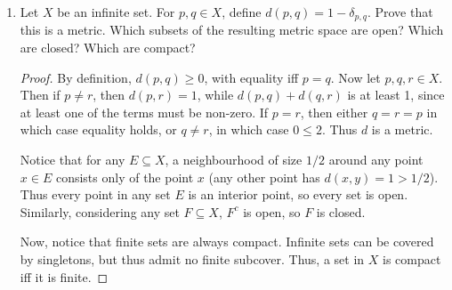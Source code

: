 \documentclass{scrbook}
\newcommand{\N}{\mathbb{N}}
\newcommand{\Q}{\mathbb{Q}}
\newcommand{\R}{\mathbb{R}}
\let\emptyset\varnothing
\begin{document}
\begin{enumerate}
\begin{enumerate}[(a)]
\begin{proof}
Now let $y \in \overline{E^c}$. If $y \in E^c$, then $y \not\in E^\circ \subseteq E$. If $y \in {E^c}'$, then every neighbourhood of $y$ contains an element of $E^c$, and thus no neighbourhood of $y$ is completely contained in $E$, so $y \not\in E^\circ$.
\end{proof}

\item Do $E$ and $\overline{E}$ always have the same interiors?
\begin{proof}
No: let $A = \{1/n : n \in \N\} \cup \{0\}$ be a subset of $\R$ and let $E = A^c$ . Then, $\overline{E} = \R$ so its interior is $\R$. However, 0 is not an interior point of $E$: every neighbourhood contains at least one point $1/n$ not in $E$. 
\end{proof}

\item Do $E$ and $E^\circ$ always have the same closures?
\begin{proof}
No: consider $E = \Q$. Then $\overline{E} = \R$ and $E^\circ = \emptyset$, whose closure is also empty.
\end{proof}
\end{enumerate}

\item %
Let $X$ be an infinite set. For $p, q \in X$, define $d(p, q) = 1 - \delta_{p, q}$. Prove that this is a metric. Which subsets of the resulting metric space are open? Which are closed? Which are compact?

\begin{proof}
By definition, $d(p, q) \ge 0$, with equality iff $p = q$. Now let $p, q, r \in X$. Then if $p \ne r$, then $d(p, r) = 1$, while $d(p, q) + d(q, r)$ is at least 1, since at least one of the terms must be non-zero. If $p = r$, then either $q = r = p$ in which case equality holds, or $q \ne r$, in which case $0 \le 2$. Thus $d$ is a metric.

Notice that for any $E \subseteq X$, a neighbourhood of size $1/2$ around any point $x \in E$ consists only of the point $x$ (any other point has $d(x, y) = 1 > 1/2$). Thus every point in any set $E$ is an interior point, so every set is open. Similarly, considering any set $F \subseteq X$, $F^c$ is open, so $F$ is closed. 

Now, notice that finite sets are always compact. Infinite sets can be covered by singletons, but thus admit no finite subcover. Thus, a set in $X$ is compact iff it is finite. 
\end{proof}


\end{enumerate}
\end{document}
